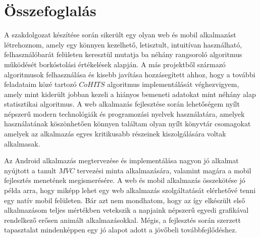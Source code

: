 \documentclass[12pt]{report}
\newtheorem{tét}{Tétel}[chapter]
\theoremstyle{definition}
\begin{document}
	\chapter{Összefoglalás}
	A szakdolgozat készítése során sikerült egy olyan web és mobil alkalmazást létrehoznom, amely egy könnyen kezelhető, letisztult, intuitívan használható, felhasználóbarát felületen keresztül mutatja ba néhány rangsoroló algoritmus működését borkóstolási értékelések alapján. A más projektből származó algoritmusok felhasználása és kisebb javítása hozzásegített ahhoz, hogy a további feladataim közé tartozó $CoHITS$ algoritmus implementálását véghezvigyem, amely mint kiderült jobban kezeli a hiányos bemeneti adatokat mint néhány alap statisztikai algoritmus. A web alkalmazás fejlesztése során lehetőségem nyílt népszerű modern technológiák és programozási nyelvek használatára, amelyek használatának köszönhetően könnyen találtam olyan nyílt könyvtár csomagokat amelyek az alkalmazás egyes kritikusabb részeinek kiszolgálására voltak alkalmasak.
	
	Az Android alkalmazás megtervezése és implementálása nagyon jó alkalmat nyújtott a tanult $MVC$ tervezési minta alkalmazására, valamint magára a mobil fejlesztés menetének megismerésére. A web és mobil alkalmazás összekötése jó példa arra, hogy miképp lehet egy web alkalmazás szolgáltatását elérhetővé tenni egy natív mobil felületen. Bár azt nem mondhatom, hogy az így elkészült első alkalmazásom teljes mértékben vetekszik a napjaink népszerű egyedi grafikával rendelkező erősen animált alkalmazásokkal. Mégis, a fejlesztés során szerzett tapasztalat mindenképpen egy jó alapot adott a jövőbeli továbbfejlődéshez. 
	
	
	
\end{document}
